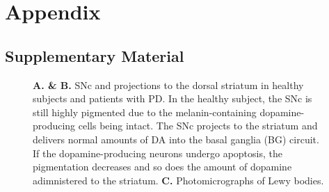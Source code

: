 \appendix
\renewcommand{\thesection}{\Alph{section}}
\chapter*{Appendix}

\section{Supplementary Material}

   \begin{figure}[h]
      \begin{center}
      \end{center}
      \caption{
         \textbf{A. \& B.} SNc and projections to the dorsal striatum in healthy subjects and patients with PD.
         In the healthy subject, the SNc is still highly pigmented due to the melanin-containing dopamine-producing cells being intact.
         The SNc projects to the striatum and delivers normal amounts of DA into the basal ganglia (BG) circuit.
         If the dopamine-producing neurons undergo apoptosis, the pigmentation decreases and so does the amount of dopamine adimnistered to the striatum.
         \textbf{C.} Photomicrographs of Lewy bodies.
      }
      \label{broad-mech}
   \end{figure}
